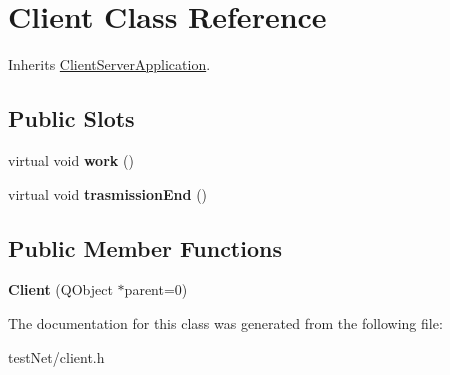 \hypertarget{class_client}{\section{Client Class Reference}
\label{class_client}
}


Inherits \hyperlink{class_client_server_application}{Client\-Server\-Application}.

\subsection*{Public Slots}
\begin{DoxyCompactItemize}
\item 
\hypertarget{class_client_a8550e4e47247c8c542d11a19b80f957f}{virtual void {\bfseries work} ()}\label{class_client_a8550e4e47247c8c542d11a19b80f957f}

\item 
\hypertarget{class_client_ad0e898efd843e9e6570be84e42c1bdeb}{virtual void {\bfseries trasmission\-End} ()}\label{class_client_ad0e898efd843e9e6570be84e42c1bdeb}

\end{DoxyCompactItemize}
\subsection*{Public Member Functions}
\begin{DoxyCompactItemize}
\item 
\hypertarget{class_client_a7832757f3fa37f564a21cb2b79b2baad}{{\bfseries Client} (Q\-Object $\ast$parent=0)}\label{class_client_a7832757f3fa37f564a21cb2b79b2baad}

\end{DoxyCompactItemize}


The documentation for this class was generated from the following file\-:\begin{DoxyCompactItemize}
\item 
test\-Net/client.\-h\end{DoxyCompactItemize}
